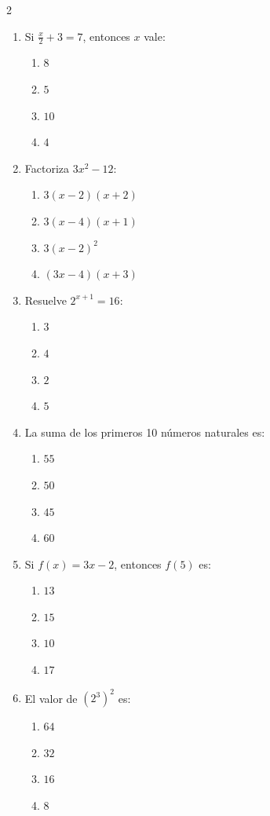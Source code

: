 \documentclass[10pt]{article}
\begin{document}
\begin{multicols}{2}
\begin{enumerate}
\item Si $\frac{x}{2} + 3 = 7$, entonces $x$ vale:
\begin{enumerate}[label=(\alph*)]
\item $8$
\item $5$
\item $10$
\item $4$
\end{enumerate}

\item Factoriza $3x^2 - 12$:
\begin{enumerate}[label=(\alph*)]
\item $3(x-2)(x+2)$
\item $3(x-4)(x+1)$
\item $3(x-2)^2$
\item $(3x-4)(x+3)$
\end{enumerate}

\item Resuelve $2^{x+1} = 16$:
\begin{enumerate}[label=(\alph*)]
\item $3$
\item $4$
\item $2$
\item $5$
\end{enumerate}

\item La suma de los primeros 10 números naturales es:
\begin{enumerate}[label=(\alph*)]
\item $55$
\item $50$
\item $45$
\item $60$
\end{enumerate}

\item Si $f(x) = 3x - 2$, entonces $f(5)$ es:
\begin{enumerate}[label=(\alph*)]
\item $13$
\item $15$
\item $10$
\item $17$
\end{enumerate}

\item El valor de $(2^3)^2$ es:
\begin{enumerate}[label=(\alph*)]
\item $64$
\item $32$
\item $16$
\item $8$
\end{enumerate}


\end{enumerate}
\end{multicols}
\end{document}
